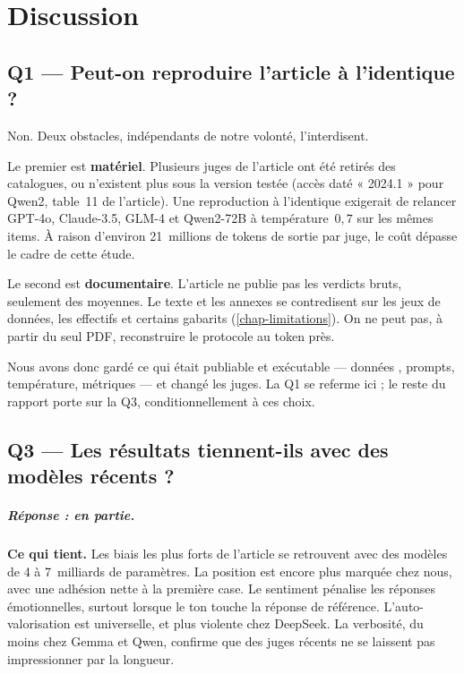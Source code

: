 \chapter{Discussion}
\label{chap-discussion}

\section{Q1 --- Peut-on reproduire l'article à l'identique ?}

Non. Deux obstacles, indépendants de notre volonté, l'interdisent.

Le premier est \textbf{matériel}. Plusieurs juges de l'article ont été retirés des catalogues, ou n'existent plus sous la version testée (accès daté « 2024.1 » pour Qwen2, table~11 de l'article). Une reproduction à l'identique exigerait de relancer GPT-4o, Claude-3.5, GLM-4 et Qwen2-72B à température~$0{,}7$ sur les mêmes items. À raison d'environ 21~millions de tokens de sortie par juge, le coût dépasse le cadre de cette étude.

Le second est \textbf{documentaire}. L'article ne publie pas les verdicts bruts, seulement des moyennes. Le texte et les annexes se contredisent sur les jeux de données, les effectifs et certains gabarits (\cref{chap-limitations}). On ne peut pas, à partir du seul PDF, reconstruire le protocole au token près.

Nous avons donc gardé ce qui était publiable et exécutable --- données \cite{calmdataset}, prompts, température, métriques --- et changé les juges. La Q1 se referme ici ; le reste du rapport porte sur la Q3, conditionnellement à ces choix.

\section{Q3 --- Les résultats tiennent-ils avec des modèles récents ?}



\paragraph{Réponse : en partie.}

\textbf{Ce qui tient.} Les biais les plus forts de l'article se retrouvent avec des modèles de 4 à 7~milliards de paramètres. La position est encore plus marquée chez nous, avec une adhésion nette à la première case. Le sentiment pénalise les réponses émotionnelles, surtout lorsque le ton touche la réponse de référence. L'auto-valorisation est universelle, et plus violente chez DeepSeek. La verbosité, du moins chez Gemma et Qwen, confirme que des juges récents ne se laissent pas impressionner par la longueur.

